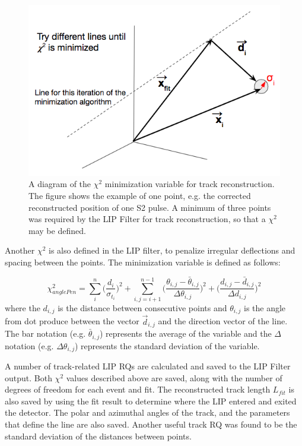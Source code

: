 \begin{figure}[htbp]
\begin{center}
\includegraphics[width=\textwidth]{figures/lips/chi2_diagram.png}
\caption{A diagram of the $\chi^{2}$ minimization variable for track reconstruction. The figure shows the example of one point, e.g. the corrected reconstructed position of one S2 pulse. A minimum of three points was required by the \acs{LIP} Filter for track reconstruction, so that a $\chi^{2}$ may be defined.   }
\label{fig:chi2_diagram}
\end{center}
\end{figure}

Another $\chi^{2}$ is also defined in the \acs{LIP} filter, to penalize irregular deflections and spacing between the points. The minimization variable is defined as follows:

\begin{equation}
\label{eq:chi2_anglePen}
\chi_{anglePen}^{2} = \sum_{i}^{n} \Big( \frac{d_{i}}{\sigma_{t_{i}}} \Big)^{2} +\sum_{i, j=i+1}^{n-1}  \Big( \frac{\theta_{i,j} - \bar{\theta}_{i,j}}{\Delta \theta_{i,j}} \Big)^{2}+ \Big( \frac{d_{i,j} - \bar{d}_{i,j}}{\Delta d_{i,j}} \Big)^{2}
\end{equation}
where the $d_{i,j}$ is the distance between consecutive points and $\theta_{i,j}$ is the angle from dot produce between the vector $\vec{d}_{i,j}$ and the direction vector of the line. The bar notation (e.g. $\bar{\theta}_{i,j}$) represents the average of the variable and the $\Delta$ notation (e.g. $\Delta \theta_{i,j}$) represents the standard deviation of the variable.

A number of track-related \ac{LIP} \ac{RQ}s are calculated and saved to the \ac{LIP} Filter output. Both $\chi^{2}$ values described above are saved, along with the number of degrees of freedom for each event and fit. The reconstructed track length $L_{fit}$ is also saved by using the fit result to determine where the \ac{LIP} entered and exited the detector. The polar and azimuthal angles of the track, and the parameters that define the line are also saved. Another useful track \ac{RQ} was found to be the standard deviation of the distances between points. 


